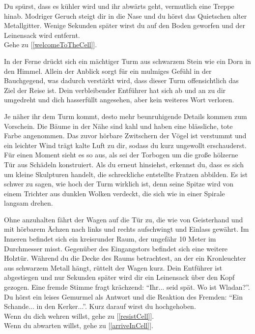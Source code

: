
Du spürst, dass es kühler wird und ihr abwärts geht, vermutlich eine Treppe hinab. Modriger Geruch steigt dir in die Nase und du hörst das Quietschen alter Metallgitter. Wenige Sekunden später wirst du auf den Boden geworfen und der Leinensack wird entfernt.
\\Gehe zu [\ref{welcomeToTheCell}].


In der Ferne drückt sich ein mächtiger Turm aus schwarzem Stein wie ein Dorn in den Himmel. Allein der Anblick sorgt für ein mulmiges Gefühl in der Bauchgegend, was dadurch verstärkt wird, dass dieser Turm offensichtlich das Ziel der Reise ist. Dein verbleibender Entführer hat sich ab und an zu dir umgedreht und dich hasserfüllt angesehen, aber kein weiteres Wort verloren.

Je näher ihr dem Turm kommt, desto mehr beunruhigende Details kommen zum Vorschein. Die Bäume in der Nähe sind kahl und haben eine blässliche, tote Farbe angenommen. Das zuvor hörbare Zwitschern der Vögel ist verstummt und ein leichter Wind trägt kalte Luft zu dir, sodass du kurz ungewollt erschauderst. Für einen Moment sieht es so aus, als sei der Torbogen um die große hölzerne Tür aus Schädeln konstruiert. Als du erneut hinsiehst, erkennst du, dass es sich um kleine Skulpturen handelt, die schreckliche entstellte Fratzen abbilden. Es ist schwer zu sagen, wie hoch der Turm wirklich ist, denn seine Spitze wird von einem Trichter aus dunklen Wolken verdeckt, die sich wie in einer Spirale langsam drehen.

Ohne anzuhalten fährt der Wagen auf die Tür zu, die wie von Geisterhand und mit hörbarem Ächzen nach links und rechts aufschwingt und Einlass gewährt. Im Inneren befindet sich ein kreisrunder Raum, der ungefähr 10 Meter im Durchmesser misst. Gegenüber des Eingangstors befindet sich eine weitere Holztür. Während du die Decke des Raums betrachtest, an der ein Kronleuchter aus schwarzem Metall hängt, rüttelt der Wagen kurz. Dein Entführer ist abgestiegen und nur Sekunden später wird dir ein Leinensack über den Kopf gezogen. Eine fremde Stimme fragt krächzend: ``Ihr... seid spät. Wo ist Wladan?''. Du hörst ein leises Gemurmel als Antwort und die Reaktion des Fremden: ``Ein Schande... in den Kerker...''. Kurz darauf wirst du hochgehoben.
\\Wenn du dich wehren willst, gehe zu [\ref{resistCell}].
\\Wenn du abwarten willst, gehe zu [\ref{arriveInCell}].

